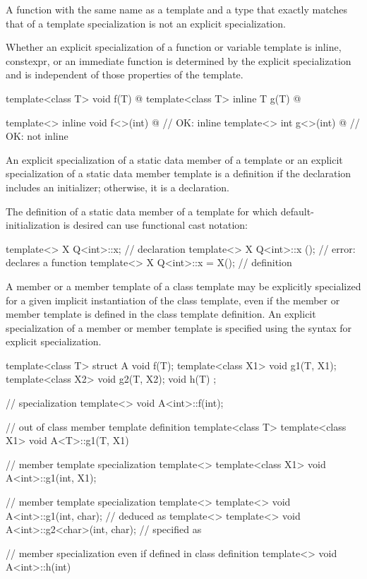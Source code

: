 \pnum
A function with the same name as a template and a type that exactly matches that
of a template specialization is not an explicit specialization.

\pnum
Whether an explicit specialization of a function or variable template
is inline, constexpr, or an immediate function
is determined by the explicit specialization and
is independent of those properties of the template.
\begin{example}
\begin{codeblock}
template<class T> void f(T) { @\commentellip@ }
template<class T> inline T g(T) { @\commentellip@ }

template<> inline void f<>(int) { @\commentellip@ }   // OK: inline
template<> int g<>(int) { @\commentellip@ }           // OK: not inline
\end{codeblock}
\end{example}

\pnum
An explicit specialization of a static data member of a template
or an explicit specialization of a static data member template is a
definition if the declaration includes an initializer;
otherwise, it is a declaration.
\begin{note}
The definition of a static data member of a template
for which default-initialization is desired
can use functional cast notation:

\begin{codeblock}
template<> X Q<int>::x;                         // declaration
template<> X Q<int>::x ();                      // error: declares a function
template<> X Q<int>::x = X();                   // definition
\end{codeblock}
\end{note}

\pnum
A member or a member template of a class template may be explicitly specialized
for a given implicit instantiation of the class template, even if the member
or member template is defined in the class template definition.
An explicit specialization of a member or member template is specified using the
syntax for explicit specialization.
\begin{example}
\begin{codeblock}
template<class T> struct A {
  void f(T);
  template<class X1> void g1(T, X1);
  template<class X2> void g2(T, X2);
  void h(T) { }
};

// specialization
template<> void A<int>::f(int);

// out of class member template definition
template<class T> template<class X1> void A<T>::g1(T, X1) { }

// member template specialization
template<> template<class X1> void A<int>::g1(int, X1);

// member template specialization
template<> template<>
  void A<int>::g1(int, char);           //  deduced as 
template<> template<>
  void A<int>::g2<char>(int, char);     //  specified as 

// member specialization even if defined in class definition
template<> void A<int>::h(int) { }
\end{codeblock}
\end{example}

